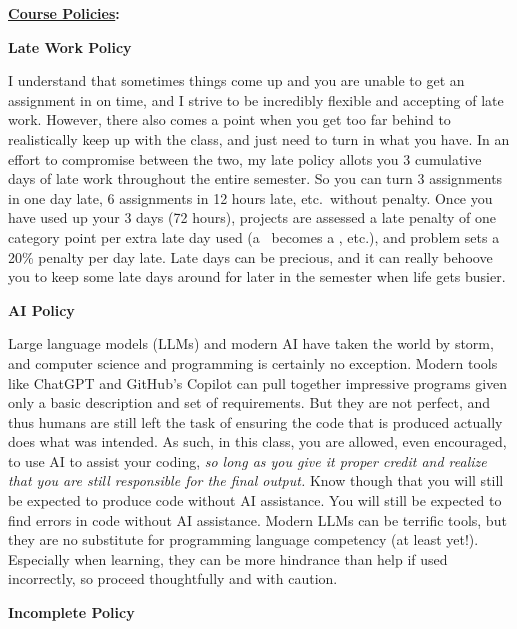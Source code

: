 \documentclass[11pt]{article}
\newcommand{\plus}{\ding{58}}
\newcommand{\cmark}{\ding{52}}
\begin{document}
\vspace{.5cm}
\textbf {\large\underline{Course Policies}:}
\vspace{0.25cm}

\textbf{Late Work Policy}

\hspace{3mm}
\hangindent=5mm I understand that sometimes things come up and you are unable to get an assignment in on time, and I strive to be incredibly flexible and accepting of late work. However, there also comes a point when you get too far behind to realistically keep up with the class, and just need to turn in what you have. In an effort to compromise between the two, my late policy allots you 3 cumulative days of late work throughout the entire semester. So you can turn 3 assignments in one day late, 6 assignments in 12 hours late, etc.\ without penalty. Once you have used up your 3 days (72 hours), projects are assessed a late penalty of one category point per extra late day used (a \cmark\plus\ becomes a \cmark, etc.), and problem sets a 20\% penalty per day late. Late days can be precious, and it can really behoove you to keep some late days around for later in the semester when life gets busier.

\vspace{0.25cm}
\textbf{AI Policy}

\hspace{3mm}
\hangindent=5mm Large language models (LLMs) and modern AI have taken the world by storm, and computer science and programming is certainly no exception. Modern tools like ChatGPT and GitHub's Copilot can pull together impressive programs given only a basic description and set of requirements. But they are not perfect, and thus humans are still left the task of ensuring the code that is produced actually does what was intended. As such, in this class, you are allowed, even encouraged, to use AI to assist your coding, \emph{so long as you give it proper credit and realize that you are still responsible for the final output.} Know though that you will still be expected to produce code without AI assistance. You will still be expected to find errors in code without AI assistance. Modern LLMs can be terrific tools, but they are no substitute for programming language competency (at least yet!). Especially when learning, they can be more hindrance than help if used incorrectly, so proceed thoughtfully and with caution.


\vspace{.25cm}
\textbf{Incomplete Policy}
\end{document}
